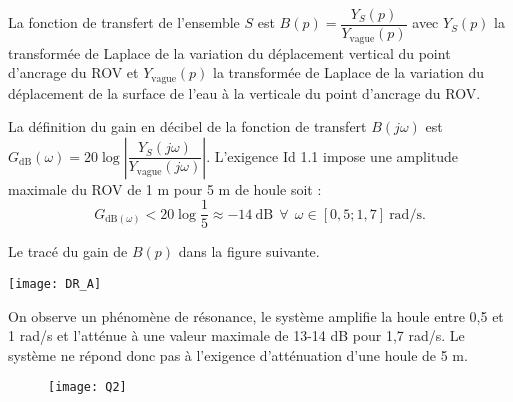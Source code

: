 \begin{multicols}{2}
La fonction de transfert de l’ensemble $S$ est $B(p) =\dfrac{Y_S(p)}{Y_{\text{vague}}(p)}$ avec $Y_S(p)$ la transformée de Laplace de la variation
du déplacement vertical du point d’ancrage du ROV et $Y_{\text{vague}}(p)$ la transformée de Laplace de la variation du déplacement de la surface de l’eau à la verticale du point d’ancrage du ROV.\\

\fi



\ifprof
\begin{corrige}

La définition du gain en décibel de la fonction de transfert $B(j\omega)$ est $G_{\text{dB}}(\omega)=20\log \left \vert \dfrac{Y_S(j\omega)}{Y_{\text{vague}}(j\omega)}\right \vert$. L'exigence Id 1.1 impose une amplitude maximale du ROV de 1 m pour 5 m de houle soit :
$$\boxed{G_{\text{dB}(\omega)}<20 \log \dfrac{1}{5}\approx - 14 \ \text{dB} \ \ \forall \ \ \omega\in[0,5;1,7]  \ \text{rad/s}.}$$
\end{corrige}
\else
\fi

\ifprof
\else
Le tracé du gain de $B(p)$ dans la figure suivante.



\begin{center}
\texttt{[image: DR\_A]}
\end{center}

\fi


\ifprof
\begin{corrige}
On observe un phénomène de résonance, le système amplifie la houle entre 0,5 et 1 rad/s et l’atténue à une valeur maximale de 13-14 dB pour 1,7 rad/s. Le syst\`eme ne répond donc pas \`a l’exigence d'atténuation d'une houle de 5 m.
\begin{figure}[H]
\centering
\texttt{[image: Q2]}
\end{figure}


\end{corrige}
\else
\fi




%



\end{multicols}
